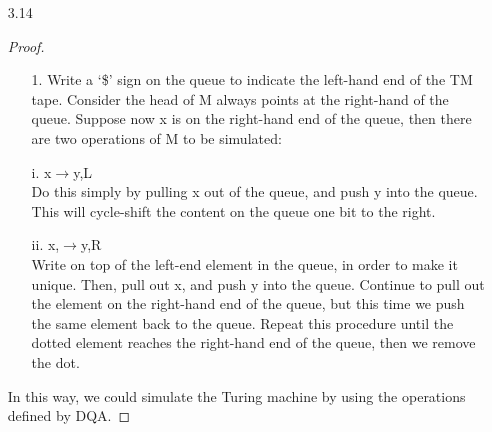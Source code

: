 \documentclass[10pt] {article}
\begin{document}
\begin{enumerate}
\begin{proof}
\[\begin{cases}
            \end{cases}
\]
The language is recognized by a NFA. Therefore a TM with a stay put instead of left recognizes the regular languages.
\end{proof}
\item[3.14]\begin{proof}
\begin{enumerate}
\item[1. ]Write a ‘\$’ sign on the queue to indicate the left-hand end of the TM tape.
Consider the head of M always points at the right-hand of the queue. Suppose now x
is on the right-hand end of the queue, then there are two operations of M to be
simulated:
\item[i.]x$\rightarrow$y,L\\
 Do this simply by pulling x out of the queue, and push y into the queue.
This will cycle-shift the content on the queue one bit to the right.
\item[ii.]x,$\rightarrow$y,R\\ 
Write on top of the left-end element in the queue, in order to make it
unique. Then, pull out x, and push y into the queue. Continue to pull out the
element on the right-hand end of the queue, but this time we push the same
element back to the queue. Repeat this procedure until the dotted element
reaches the right-hand end of the queue, then we remove the dot. 
\end{enumerate}
In this way, we could simulate the Turing machine by using the operations defined by
DQA. 


\end{proof}
\end{enumerate}
\end{document}

